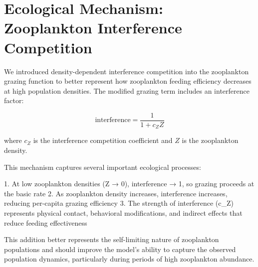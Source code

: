 \section{Ecological Mechanism: Zooplankton Interference Competition}

We introduced density-dependent interference competition into the zooplankton grazing function to better represent how zooplankton feeding efficiency decreases at high population densities. The modified grazing term includes an interference factor:

\[ \text{interference} = \frac{1}{1 + c_Z Z} \]

where $c_Z$ is the interference competition coefficient and $Z$ is the zooplankton density.

This mechanism captures several important ecological processes:

1. At low zooplankton densities (Z → 0), interference → 1, so grazing proceeds at the basic rate
2. As zooplankton density increases, interference increases, reducing per-capita grazing efficiency
3. The strength of interference (c_Z) represents physical contact, behavioral modifications, and indirect effects that reduce feeding effectiveness

This addition better represents the self-limiting nature of zooplankton populations and should improve the model's ability to capture the observed population dynamics, particularly during periods of high zooplankton abundance.
